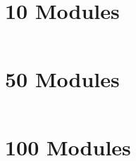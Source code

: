 \section{10 Modules}
\inputminted[fontsize=\scriptsize]{text}{./results/10m10p.txt}

\section{50 Modules}
\inputminted[fontsize=\scriptsize]{text}{./results/50m100p.txt}

\section{100 Modules}
\inputminted[fontsize=\scriptsize]{text}{./results/100m50p.txt}

